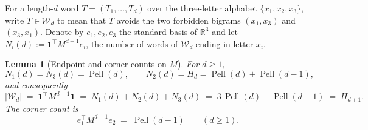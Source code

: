 \documentclass{amsart}
\newtheorem{lemma}[theorem]{Lemma}
\theoremstyle{definition}
\theoremstyle{remark}
\newcommand{\R}{\mathbb{R}}
\DeclareMathOperator{\Pell}{Pell}
\begin{document}
For a length-$d$ word $T = (T_1, \ldots, T_d)$ over the three-letter
alphabet $\{x_1, x_2, x_3\}$, write $T \in \mathcal{W}_d$ to mean
that $T$ avoids the two forbidden bigrams $(x_1, x_3)$ and $(x_3, x_1)$.
Denote by $e_1, e_2, e_3$ the standard basis of $\R^3$ and let
$N_i(d) := \mathbf{1}^\top M^{d-1} e_i$, the number of words of
$\mathcal{W}_d$ ending in letter $x_i$.

\begin{lemma}[Endpoint and corner counts on $M$]\label{lem:word-counts}
For $d \ge 1$,
\begin{equation}\label{eq:endpoint-counts}
  N_1(d) = N_3(d) = \Pell(d), \qquad
  N_2(d) = H_d = \Pell(d) + \Pell(d-1),
\end{equation}
and consequently
\begin{equation}\label{eq:total-count}
  |\mathcal{W}_d| \;=\; \mathbf{1}^\top M^{d-1} \mathbf{1}
     \;=\; N_1(d) + N_2(d) + N_3(d)
     \;=\; 3\,\Pell(d) + \Pell(d-1)
     \;=\; H_{d+1}.
\end{equation}
The corner count is
\begin{equation}\label{eq:corner-count}
  e_1^\top M^{d-1} e_2 \;=\; \Pell(d-1) \qquad (d \ge 1).
\end{equation}
\end{lemma}
\end{document}
